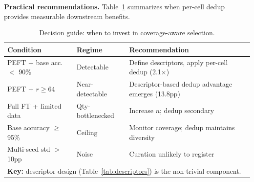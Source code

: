 \documentclass{article}
\theoremstyle{plain}
\theoremstyle{remark}
\begin{document}
\textbf{Practical recommendations.}
Table~\ref{tab:decision} summarizes when per-cell dedup provides measurable downstream benefits.



\begin{table}[h]
\centering
\caption{Decision guide: when to invest in coverage-aware selection.}
\label{tab:decision}
\begin{tabularx}{\linewidth}{p{2.5cm}p{2cm}X}
\toprule
\textbf{Condition} & \textbf{Regime} & \textbf{Recommendation} \\
\midrule
PEFT + base acc. $<$ 90\% & Detectable & Define descriptors, apply per-cell dedup (2.1$\times$) \\
PEFT + $r{\geq}64$ & Near-detectable & Descriptor-based dedup advantage emerges (13.8pp) \\
Full FT + limited data & Qty-bottlenecked & Increase $n$; dedup secondary \\
Base accuracy $\geq$ 95\% & Ceiling & Monitor coverage; dedup maintains diversity \\
Multi-seed std $>$ 10pp & Noise & Curation unlikely to register \\
\midrule
\multicolumn{3}{l}{\textbf{Key:} descriptor design (Table~\ref{tab:descriptors}) is the non-trivial component.} \\
\bottomrule
\end{tabularx}
\end{table}
\end{document}
